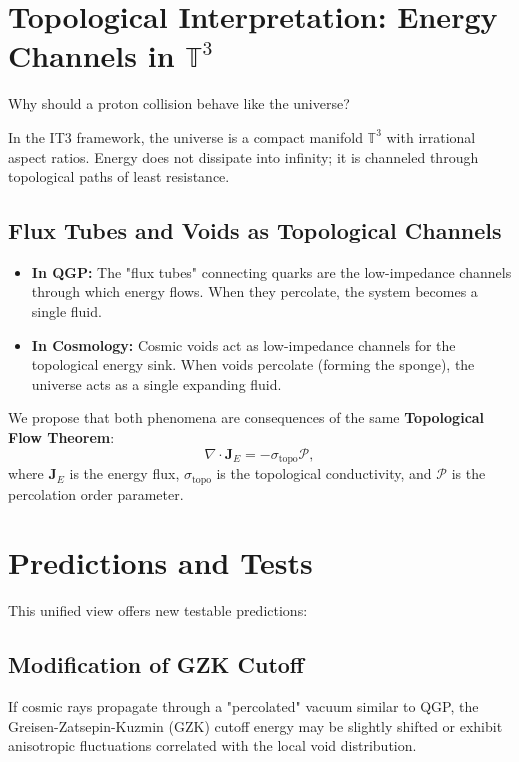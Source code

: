 \documentclass[12pt,a4paper]{article}
\begin{document}
\section{Topological Interpretation: Energy Channels in $\mathbb{T}^3$}

Why should a proton collision behave like the universe?

In the IT3 framework, the universe is a compact manifold $\mathbb{T}^3$ with irrational aspect ratios. Energy does not dissipate into infinity; it is channeled through topological paths of least resistance.

\subsection{Flux Tubes and Voids as Topological Channels}
\begin{itemize}
    \item \textbf{In QGP:} The "flux tubes" connecting quarks are the low-impedance channels through which energy flows. When they percolate, the system becomes a single fluid.
    \item \textbf{In Cosmology:} Cosmic voids act as low-impedance channels for the topological energy sink. When voids percolate (forming the sponge), the universe acts as a single expanding fluid.
\end{itemize}

We propose that both phenomena are consequences of the same \textbf{Topological Flow Theorem}:
\begin{equation}
\nabla \cdot \mathbf{J}_E = -\sigma_{\mathrm{topo}} \mathcal{P},
\end{equation}
where $\mathbf{J}_E$ is the energy flux, $\sigma_{\mathrm{topo}}$ is the topological conductivity, and $\mathcal{P}$ is the percolation order parameter.

\section{Predictions and Tests}

This unified view offers new testable predictions:

\subsection{Modification of GZK Cutoff}
If cosmic rays propagate through a "percolated" vacuum similar to QGP, the Greisen-Zatsepin-Kuzmin (GZK) cutoff energy may be slightly shifted or exhibit anisotropic fluctuations correlated with the local void distribution.
\end{document}
